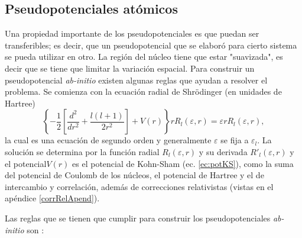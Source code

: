    \subsection{Pseudopotenciales at\'omicos}
   Una propiedad importante de los pseudopotenciales es que puedan ser transferibles; es decir, que un pseudopotencial que se elabor\'o para cierto sistema se pueda utilizar en otro. La regi\'on del n\'ucleo tiene que estar "suavizada", es decir que se tiene que limitar la variaci\'on espacial. Para construir un pseudopotencial \textit{ab-initio} existen algunas reglas que ayudan a resolver el problema. Se comienza con la ecuaci\'on radial de Shr\"odinger (en unidades de Hartree) \cite{PhysRevB.26.4199}
   \begin{equation}
   \left\{-\frac{1}{2} \left[\frac{d^2}{dr^2} + \frac{l (l+1)}{2 r^2} \right]+ V(r)\right\} r R_l (\varepsilon,r) = \varepsilon r R_l (\varepsilon,r) \label{ec:ShRadial},
   \end{equation}  
   la cual es una ecuaci\'on de segundo orden y generalmente $\varepsilon$ se fija a $\varepsilon_l$. La soluci\'on se determina por la funci\'on radial $R_l (\varepsilon,r)  $ y su derivada $R'_l (\varepsilon,r)  $  y el potencial$V(r)$ es el potencial de Kohn-Sham (ec. \ref{ec:potKS}), como la suma del potencial de Coulomb de los n\'ucleos, el potencial de Hartree y el de intercambio y correlaci\'on, adem\'as de correcciones relativistas \cite{Martin-2004}(vistas en el ap\'endice \ref{corrRelApend}). 
   \newline
   \par Las reglas que se tienen que cumplir para construir los pseudopotenciales \textit{ab-initio} son \cite{PhysRevLett.43.1494, MB-2015}:
